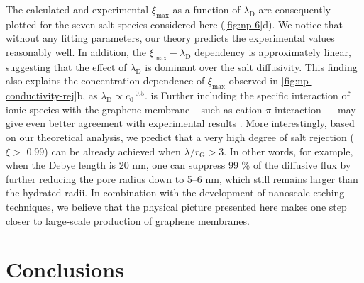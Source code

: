 %
The calculated and
experimental $\xi_{\mathrm{max}}$ as a function of
$\lambda_{\mathrm{D}}$ are consequently plotted for the seven salt
species considered here (\autoref{fig:np-6}d).  
We notice that
without any fitting parameters, our theory predicts the
experimental values reasonably well.
%
In addition, the $\xi_{\mathrm{max}}-\lambda_{\mathrm{D}}$ dependency
is approximately linear, suggesting that the effect of
$\lambda_{\mathrm{D}}$ is dominant over the salt diffusivity.
%
This
finding also explains the concentration dependence of
$\xi_{\mathrm{max}}$ observed in \autoref{fig:np-conductivity-rej}b, as
$\lambda_{\mathrm{D}} \propto c_{0}^{-0.5}$.
%
is %
Further including
the specific interaction of ionic species with the graphene membrane
-- such as cation-$\pi$ interaction~\autocite{Shi_2013_ion_enrichment} --
may give even better agreement with experimental results
\autocite{Ghosh_2018_PG_ion}.
%
More interestingly, based on our theoretical
analysis, we predict that a very high degree of salt rejection ($\xi>$
0.99) can be already achieved when $\lambda / r_{\mathrm{G}}>$3.
%
In
other words, for example, when the Debye length is 20 nm, one can
suppress 99 \% of the diffusive flux by further reducing the pore
radius down to 5--6 nm, which still remains larger than the
hydrated radii.
%
In combination with the development of nanoscale
etching techniques, we believe that the physical picture presented
here makes one step closer to large-scale production of graphene
membranes.

\section{Conclusions}
\label{sec:np-conclusions}

